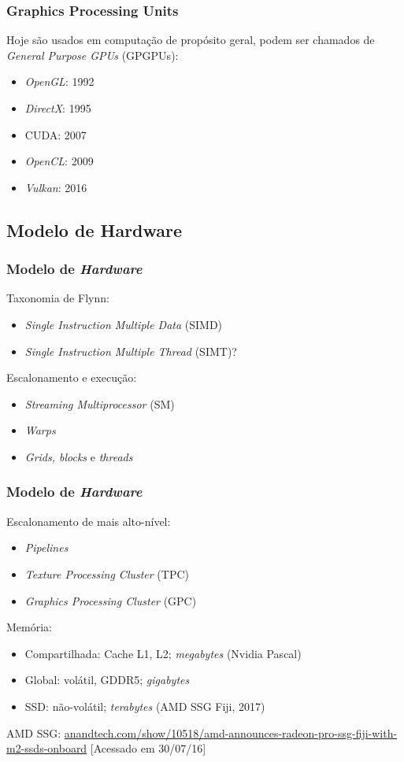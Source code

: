 \documentclass[10pt, compress]{beamer}
\begin{document}
\begin{frame}
    \frametitle{Graphics Processing Units}
    Hoje são usados em computação de propósito geral, podem ser chamados de
    \textit{General Purpose GPUs} (GPGPUs):
    \begin{itemize}
        \item \textit{OpenGL}: 1992
        \item \textit{DirectX}: 1995
        \item \alert{CUDA}: 2007
        \item \textit{OpenCL}: 2009
        \item \textit{Vulkan}: 2016
    \end{itemize}
\end{frame}

\subsection{Modelo de Hardware}

\begin{frame}
    \frametitle{Modelo de \textit{Hardware}}
    Taxonomia de Flynn:
    \begin{itemize}
        \item \textit{Single Instruction Multiple Data} (SIMD)
            \pause
        \item \textit{Single Instruction Multiple Thread} (SIMT)?
    \end{itemize}
    \pause
    Escalonamento e execução:
    \begin{itemize}
        \item \textit{Streaming Multiprocessor} (SM)
            \pause
        \item \textit{Warps}
            \pause
        \item \textit{Grids, blocks} e \textit{threads}
    \end{itemize}
\end{frame}

\begin{frame}
    \frametitle{Modelo de \textit{Hardware}}
    Escalonamento de mais alto-nível:
    \begin{itemize}
        \item \textit{Pipelines}
        \item \textit{Texture Processing Cluster} (TPC)
        \item \textit{Graphics Processing Cluster} (GPC)
    \end{itemize}
    \pause
    Memória:
    \begin{itemize}
        \item Compartilhada: Cache L1, L2; \textit{megabytes} (Nvidia Pascal)
        \item Global: volátil, GDDR5; \textit{gigabytes}
            \pause
        \item SSD: \alert{não-volátil}; \alert{\textit{terabytes}} (AMD SSG Fiji, 2017)
    \end{itemize}
    \vfill

    \tiny{AMD SSG: \url{anandtech.com/show/10518/amd-announces-radeon-pro-ssg-fiji-with-m2-ssds-onboard} [Acessado em 30/07/16]}
\end{frame}
\end{document}
